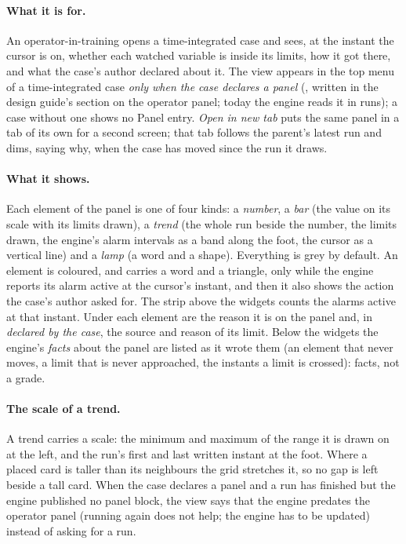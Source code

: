 \documentclass[11pt,a4paper]{article}
\begin{document}
\paragraph{What it is for.}  An operator-in-training opens a
time-integrated case and sees, at the instant the cursor is on, whether
each watched variable is inside its limits, how it got there, and what the
case's author declared about it.  The view appears in the top menu of a
time-integrated case \emph{only when the case declares a panel}
(, written in the design guide's section on the
operator panel; today the engine reads it in  runs); a case
without one shows no Panel entry.  \emph{Open in new tab} puts the same panel in a tab of
its own for a second screen; that tab follows the parent's latest run and
dims, saying why, when the case has moved since the run it draws.

\paragraph{What it shows.}  Each element of the panel is one of four kinds:
a \emph{number}, a \emph{bar} (the value on its scale with its limits drawn),
a \emph{trend} (the whole run beside the number, the limits drawn, the
engine's alarm intervals as a band along the foot, the cursor as a vertical
line) and a \emph{lamp} (a word and a shape).  Everything is grey by
default.  An element is coloured, and carries a word and a triangle, only
while the engine reports its alarm active at the cursor's instant, and then
it also shows the action the case's author asked for.  The strip above the
widgets counts the alarms active at that instant.  Under each element are the
reason it is on the panel and, in \emph{declared by the case}, the source and
reason of its limit.  Below the widgets the engine's \emph{facts} about the
panel are listed as it wrote them (an element that never moves, a limit that
is never approached, the instants a limit is crossed): facts, not a grade.

\paragraph{The scale of a trend.}  A trend carries a scale: the minimum and
maximum of the range it is drawn on at the left, and the run's first and last
written instant at the foot.  Where a placed card is taller than its
neighbours the grid stretches it, so no gap is left beside a tall card.  When
the case declares a panel and a run has finished but the engine published no
panel block, the view says that the engine predates the operator panel
(running again does not help; the engine has to be updated) instead of asking
for a run.
\end{document}
